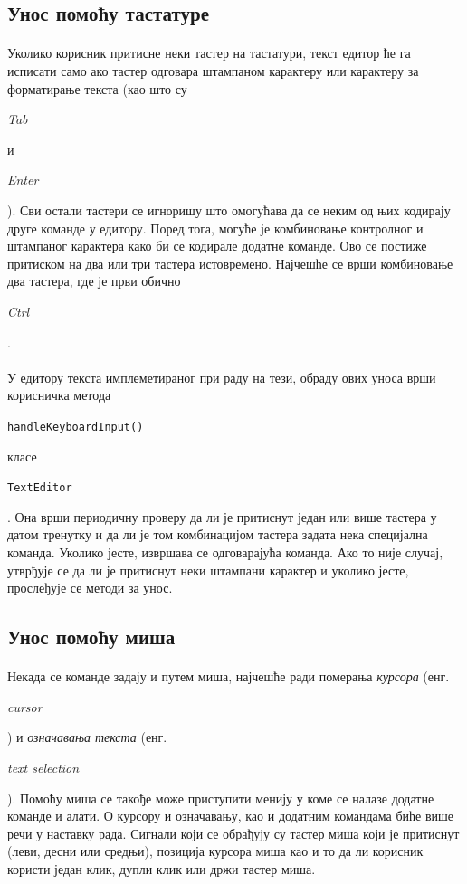 \documentclass[12pt,oneside]{memoir}
\begin{document}
\subsection{Унос помоћу тастатуре}
\paragraph{}
Уколико корисник притисне неки тастер на тастатури, текст едитор ће га исписати само
ако тастер одговара штампаном карактеру или карактеру за форматирање текста (као што
су \begin{latinica}\textit{Tab}\end{latinica} и \begin{latinica}\textit{Enter}\end{latinica}). Сви остали тастери се игноришу
што омогућава да се неким од њих кодирају друге команде у едитору. 
Поред тога, могуће је комбиновање контролног и штампаног карактера како
би се кодирале додатне команде. Ово се постиже притиском на два или три тастера истовремено. Најчешће се врши комбиновање два тастера, где је први обично \begin{latinica}\textit{Ctrl}\end{latinica}.

\paragraph{}
У едитору текста имплеметираног при раду на тези, обраду ових уноса врши корисничка метода \begin{latinica}\verb|handleKeyboardInput()|\end{latinica} класе
\begin{latinica}\verb|TextEditor|\end{latinica}. Она врши периодичну проверу да ли
је притиснут један или више тастера у датом тренутку и да ли је том комбинацијом тастера 
задата нека специјална команда. Уколико јесте, извршава се одговарајућа команда. Ако
то није случај, утврђује се да ли је притиснут неки штампани карактер и уколико јесте,
прослеђује се методи за унос.


\subsection{Унос помоћу миша}
\paragraph{} 
Некада се команде задају и путем миша, најчешће ради померања \emph{курсора} 
(енг. \begin{latinica}\textit{cursor}\end{latinica}) и \emph{означавања текста}
(енг. \begin{latinica}\textit{text selection}\end{latinica}). Помоћу миша се такође 
може приступити менију у коме се налазе додатне команде и алати.
О курсору и означавању, као и додатним командама биће више речи у наставку рада.
Сигнали који се обрађују су тастер миша који је притиснут (леви, десни или средњи),
позиција курсора миша као и то да ли корисник користи један клик, дупли клик или
држи тастер миша.
\end{document}
